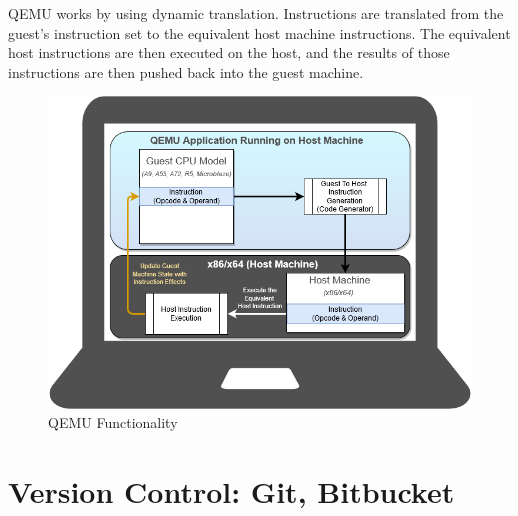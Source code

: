 QEMU works by using dynamic translation. Instructions are translated from the guest's instruction set to the equivalent host machine instructions. The equivalent host instructions are then executed on the host, and the results of those instructions are then pushed back into the guest machine.
    
\begin{figure}[H]
\begin{center}
\includegraphics[width=\textwidth]{images/QEMU.png}
\caption{QEMU Functionality}
\label{QEMU}
\end{center}
\end{figure}

\pagebreak


\section{Version Control: Git, Bitbucket}

